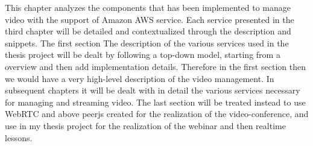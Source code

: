 This chapter analyzes the components that has been implemented to manage video with the support of Amazon AWS service.
Each service presented in the third chapter will be detailed and contextualized through the description and snippets. 
The first section The description of the various services used in the thesis project will be dealt by following a top-down model, starting from a overview and then add implementation details.
Therefore in the first section then we would have a very high-level description of the video management.
In subsequent chapters it will be dealt with in detail the various services necessary for managing and streaming video.
The last section will be treated instead to use WebRTC and above peerjs created for the realization of the video-conference, and use in my thesis project for the realization of the webinar and then realtime lessons.